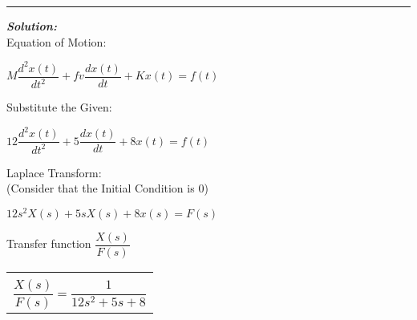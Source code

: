 \documentclass[11pt,letterpaper]{article}
\begin{document}
\rule{\textwidth}{1pt}
\vspace{12pt}
\textit{\textbf{Solution:}}\\	
Equation of Motion:\\
\begin{center}
	$M\dfrac{d^2x(t)}{dt^2}+fv\dfrac{dx(t)}{dt}+Kx(t)=f(t)$\\
\end{center}
Substitute the Given:\\
\begin{center}
	$12\dfrac{d^2x(t)}{dt^2}+5\dfrac{dx(t)}{dt}+8x(t)=f(t)$\\
\end{center}
Laplace Transform:\\[12pt]
(Consider that the Initial Condition is $0$)\\
\begin{center}
	$12s^2X(s)+5sX(s)+8x(s)=F(s)$\\
\end{center}
Transfer function $\dfrac{X(s)}{F(s)}$\\
\begin{center}
	\begin{tabular}{|c|}
		\hline \\
		$\dfrac{X(s)}{F(s)}=\dfrac{1}{12s^2+5s+8}$	\\ [12pt]
	\hline
	\end{tabular}	
\end{center}

\clearpage
\end{document}
